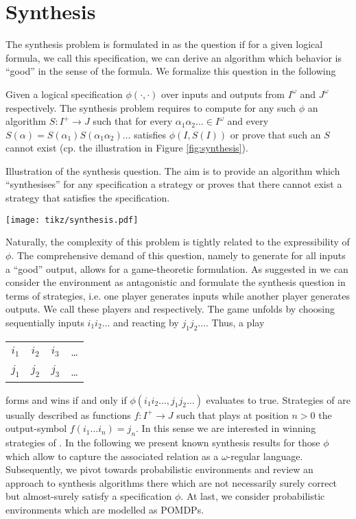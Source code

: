 \chapter{Synthesis}
\label{chapter:synthesis}
The synthesis problem is formulated in \cite{Church} as the question if for a 
given logical formula, we call this specification, we can derive an algorithm
which behavior is \enquote{good} in the sense of the formula. We formalize this
question in the following
\begin{definition}
  Given a logical specification  $\phi(\cdot, \cdot)$ over inputs and 
  outputs from $I^{\omega}$ and $J^{\omega}$ respectively. The synthesis 
  problem requires to compute for any such $\phi$ an algorithm 
  $S:I^{+}\rightarrow J$ such that for every 
  $\alpha_{1}\alpha_{2}\dots\in I^{\omega}$ and every 
  $S(\alpha) = S(\alpha_{1})S(\alpha_{1}\alpha_{2})\dots$ satisfies 
  $\phi(I, S(I))$ or prove that such an $S$ cannot exist (cp. the 
  illustration in Figure \ref{fig:synthesis}).
\end{definition}
\begin{drawing}
  \caption{Illustration of the synthesis question. The aim is to provide an 
  algorithm which \enquote{synthesises} for any specification a strategy or 
  proves that there cannot exist a strategy that satisfies the specification.}
  \label{fig:synthesis}
  \begin{center}
    \texttt{[image: tikz/synthesis.pdf]}
  \end{center}
\end{drawing}
Naturally, the complexity of this problem is tightly related to the 
expressibility of $\phi$. The comprehensive demand of this question, namely
to generate for all inputs a \enquote{good} output, allows for a
game-theoretic formulation. As suggested in \cite{SeqCondStrat} we can consider
the environment as antagonistic and formulate the synthesis question in terms
of strategies, i.e. one player generates inputs while another player generates
outputs. We call these players  and \outputp{} respectively. The game
unfolds by  choosing sequentially inputs $i_{1}i_{2}\dots$ and 
\outputp{} reacting by $j_{1}j_{2}\dots$. Thus, a play
\begin{tabular}{cccc}
  $i_{1}$ & $i_{2}$ & $i_{3}$ & \dots\\
  $j_{1}$ & $j_{2}$ & $j_{3}$ & \dots
\end{tabular}
forms and \outputp{} wins if and only if 
$\phi(i_{1}i_{2}\dots,j_{1}j_{2}\dots)$ evaluates to true. Strategies of 
\outputp{} are usually described as functions $f:I^{+}\rightarrow J$ such that
\outputp{} plays at position $n>0$ the output-symbol 
$f(i_{1}\dots i_{n}) = j_{n}$. In this sense we are interested in winning 
strategies of \outputp{}. In the following we present known synthesis results 
for those $\phi$ which allow to capture the associated relation as a 
$\omega$-regular language. Subsequently, we pivot towards probabilistic 
environments and review an approach to synthesis algorithms there which are not 
necessarily surely correct but almost-surely satisfy a specification $\phi$. 
At last, we consider probabilistic environments which are modelled as
\acp{POMDP}.

